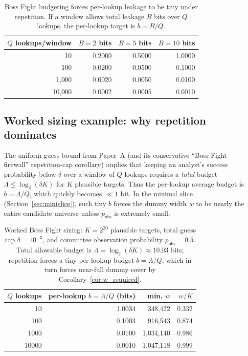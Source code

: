 \documentclass[11pt]{article}
\newcommand{\logtwo}{\log_2}
\begin{document}
\begin{table}[t]
\centering
\caption{Boss Fight budgeting forces per-lookup leakage to be tiny under repetition. If a window allows total leakage $B$ bits over $Q$ lookups, the per-lookup target is $b=B/Q$.}
\label{tab:per-lookup-target}
\begin{tabular}{r r r r}
\toprule
$Q$ lookups/window & $B{=}2$ bits & $B{=}5$ bits & $B{=}10$ bits\\
\midrule
10 & 0.2000 & 0.5000 & 1.0000\\
100 & 0.0200 & 0.0500 & 0.1000\\
1,000 & 0.0020 & 0.0050 & 0.0100\\
10,000 & 0.0002 & 0.0005 & 0.0010\\
\bottomrule
\end{tabular}
\end{table}

\subsection{Worked sizing example: why repetition dominates}\label{sec:worked}
The uniform-guess bound from Paper~A (and its conservative ``Boss Fight firewall'' repetition-cap corollary) implies that keeping an analyst's success probability below $\delta$ over a window of $Q$ lookups requires a \emph{total} budget $\Lambda\le \logtwo(\delta K)$ for $K$ plausible targets.
Thus the per-lookup average budget is $b=\Lambda/Q$, which quickly becomes $\ll 1$ bit.
In the minimal slice (Section~\ref{sec:minislice}), such tiny $b$ forces the dummy width $w$ to be nearly the entire candidate universe unless $p_{\mathsf{obs}}$ is extremely small.

\begin{table}[t]
\centering
\caption{Worked Boss Fight sizing: $K=2^{20}$ plausible targets, total guess cap $\delta=10^{-3}$, and committee observation probability $p_{\mathsf{obs}}=0.5$. Total allowable budget is $\Lambda=\log_2(\delta K)\approx10.03$ bits; repetition forces a tiny per-lookup budget $b=\Lambda/Q$, which in turn forces near-full dummy cover by Corollary~\ref{cor:w_required}.}
\label{tab:worked-repetition}
\begin{tabular}{r r r r}
\toprule
$Q$ lookups & per-lookup $b=\Lambda/Q$ (bits) & min. $w$ & $w/K$ \\
\midrule
10 & 1.0034 & 348,422 & 0.332 \\
100 & 0.1003 & 916,543 & 0.874 \\
1000 & 0.0100 & 1,034,140 & 0.986 \\
10000 & 0.0010 & 1,047,118 & 0.999 \\
\bottomrule
\end{tabular}
\end{table}
\end{document}
